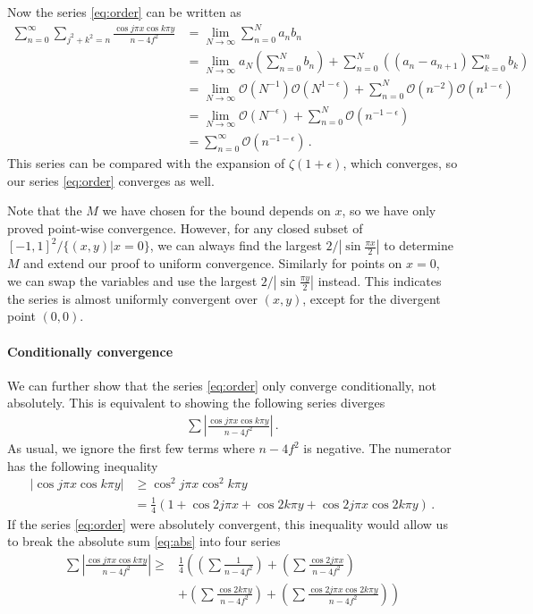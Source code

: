 \documentclass[]{article}
\begin{document}
Now the series \eqref{eq:order} can be written as
\begin{align*}
 \sum_{n=0}^{\infty}\sum_{j^2+k^2=n} \frac{\cos j\pi x \cos k\pi y}{n - 4f^2}&= \lim_{N\to\infty} \sum_{n=0}^{N}a_n b_n\\
 &=\lim_{N\to\infty} a_N \left(\sum_{n=0}^{N}b_n\right) + \sum_{n=0}^{N}\left((a_n - a_{n+1})\sum_{k=0}^{n}b_k\right)\\
 &=\lim_{N\to\infty} \mathcal{O}(N^{-1})\mathcal{O}(N^{1-\epsilon}) + \sum_{n=0}^{N}\mathcal{O}(n^{-2})\mathcal{O}(n^{1-\epsilon})\\
 &=\lim_{N\to\infty} \mathcal{O}(N^{-\epsilon}) + \sum_{n=0}^{N}\mathcal{O}(n^{-1-\epsilon})\\
 &=\sum_{n=0}^{\infty}\mathcal{O}(n^{-1-\epsilon})\,.
\end{align*}
This series can be compared with the expansion of $\zeta(1+\epsilon)$, which converges, so our series \eqref{eq:order} converges as well.

Note that the $M$ we have chosen for the bound depends on $x$, so we have only proved point-wise convergence. However, for any closed subset of $[-1,1]^2\slash\{(x, y)|x = 0\}$, we can always find the largest $2/|\sin\frac{\pi x}{2}|$ to determine $M$ and extend our proof to uniform convergence. Similarly for points on $x = 0$, we can swap the variables and use the largest $2/|\sin\frac{\pi y}{2}|$ instead. This indicates the series is almost uniformly convergent over $(x, y)$, except for the divergent point $(0, 0)$.

\paragraph{Conditionally convergence} We can further show that the series \eqref{eq:order} only converge conditionally, not absolutely. This is equivalent to showing the following series diverges
\begin{align}
\sum \left|\frac{\cos j\pi x \cos k\pi y}{n - 4f^2}\right|\,. \label{eq:abs}
\end{align}
As usual, we ignore the first few terms where $n-4f^2$ is negative. The numerator has the following inequality
\begin{align*}
|\cos j\pi x \cos k\pi y| &\ge \cos^2 j\pi x \cos^2 k\pi y\\
&=\frac{1}{4}(1 + \cos 2j\pi x + \cos 2k\pi y  + \cos 2j\pi x\cos2 k\pi y)\,.
\end{align*}
If the series \eqref{eq:order} were absolutely convergent, this inequality would allow us to break the absolute sum \eqref{eq:abs} into four series
\begin{align*}
\sum \left|\frac{\cos j\pi x \cos k\pi y}{n - 4f^2}\right|\ge& \frac{1}{4}\left(\left(\sum \frac{1}{n - 4f^2}\right) + \left(\sum \frac{\cos 2j\pi x}{n - 4f^2}\right)\right.\\
 &+ \left.\left(\sum \frac{\cos 2k\pi y}{n - 4f^2}\right) + \left(\sum \frac{\cos 2j\pi x\cos2 k\pi y}{n - 4f^2}\right)\right)
\end{align*}
\end{document}
